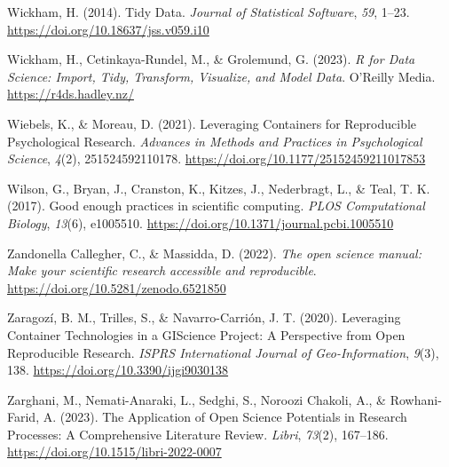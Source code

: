 \documentclass[
  a4paper,
]{book}
\newlength{\cslhangindent}
\newenvironment{CSLReferences}[2] %
 {\begin{list}{}{%
  \setlength{\itemindent}{0pt}
  \setlength{\leftmargin}{0pt}
  \setlength{\parsep}{0pt}
  \ifodd #1
   \setlength{\leftmargin}{\cslhangindent}
   \setlength{\itemindent}{-1\cslhangindent}
  \fi
  \setlength{\itemsep}{#2\baselineskip}}}
 {\end{list}}
\begin{document}
\begin{CSLReferences}{1}{0}
Wickham, H. (2014). Tidy Data. \emph{Journal of Statistical Software},
\emph{59}, 1--23. \url{https://doi.org/10.18637/jss.v059.i10}

Wickham, H., Cetinkaya-Rundel, M., \& Grolemund, G. (2023). \emph{R for
Data Science: Import, Tidy, Transform, Visualize, and Model Data}.
O'Reilly Media. \url{https://r4ds.hadley.nz/}

Wiebels, K., \& Moreau, D. (2021). Leveraging {Containers} for
{Reproducible Psychological Research}. \emph{Advances in Methods and
Practices in Psychological Science}, \emph{4}(2), 251524592110178.
\url{https://doi.org/10.1177/25152459211017853}

Wilson, G., Bryan, J., Cranston, K., Kitzes, J., Nederbragt, L., \&
Teal, T. K. (2017). Good enough practices in scientific computing.
\emph{PLOS Computational Biology}, \emph{13}(6), e1005510.
\url{https://doi.org/10.1371/journal.pcbi.1005510}

Zandonella Callegher, C., \& Massidda, D. (2022). \emph{The open science
manual: Make your scientific research accessible and reproducible}.
\url{https://doi.org/10.5281/zenodo.6521850}

Zaragozí, B. M., Trilles, S., \& Navarro-Carrión, J. T. (2020).
Leveraging Container Technologies in a GIScience Project: A Perspective
from Open Reproducible Research. \emph{ISPRS International Journal of
Geo-Information}, \emph{9}(3), 138.
\url{https://doi.org/10.3390/ijgi9030138}

Zarghani, M., Nemati-Anaraki, L., Sedghi, S., Noroozi Chakoli, A., \&
Rowhani-Farid, A. (2023). The Application of Open Science Potentials in
Research Processes: A Comprehensive Literature Review. \emph{Libri},
\emph{73}(2), 167--186. \url{https://doi.org/10.1515/libri-2022-0007}

\end{CSLReferences}


\backmatter

\printindex

\end{document}
